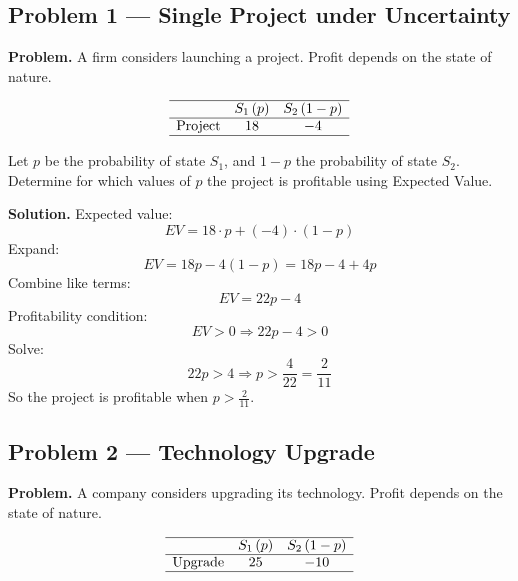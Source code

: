 	
	\begin{ExamProblems}
		
		\hypertarget{c7-ex1}{}
		\item\leavevmode\par
		\subsection*{Problem 1 — Single Project under Uncertainty}
		
		\textbf{Problem.}
		A firm considers launching a project. Profit depends on the state of nature.
		
		\[
		\begin{array}{lcc}
			\hline
			& S_1\,(p) & S_2\,(1-p) \\
			\hline
			\text{Project} & 18 & -4 \\
			\hline
		\end{array}
		\]
		
		Let \(p\) be the probability of state \(S_1\), and \(1-p\) the probability of state \(S_2\).  
		Determine for which values of \(p\) the project is profitable using Expected Value.
		
		\textbf{Solution.}
		Expected value:
		\[
		EV = 18\cdot p + (-4)\cdot(1-p)
		\]
		Expand:
		\[
		EV = 18p - 4(1-p) = 18p - 4 + 4p
		\]
		Combine like terms:
		\[
		EV = 22p - 4
		\]
		Profitability condition:
		\[
		EV>0 \Rightarrow 22p-4>0
		\]
		Solve:
		\[
		22p>4 \Rightarrow p>\frac{4}{22}=\frac{2}{11}
		\]
		So the project is profitable when \(p>\frac{2}{11}\).
		
		
		\hypertarget{c7-ex2}{}
		\item\leavevmode\par
		\subsection*{Problem 2 — Technology Upgrade}
		
		\textbf{Problem.}
		A company considers upgrading its technology. Profit depends on the state of nature.
		
		\[
		\begin{array}{lcc}
			\hline
			& S_1\,(p) & S_2\,(1-p) \\
			\hline
			\text{Upgrade} & 25 & -10 \\
			\hline
		\end{array}
		\]
		

\end{ExamProblems}
